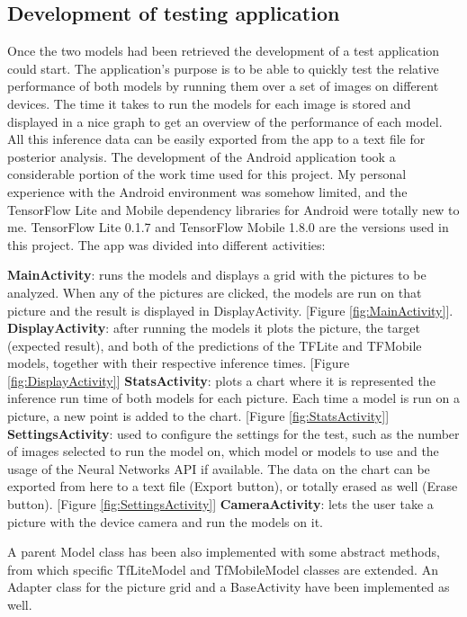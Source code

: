 \subsection{Development of testing application}
Once the two models had been retrieved the development of a test application could start. The application's purpose is to be able to quickly test the relative performance of both models by running them over a set of images on different devices. The time it takes to run the models for each image is stored and displayed in a nice graph to get an overview of the performance of each model. All this inference data can be easily exported from the app to a text file for posterior analysis. The development of the Android application took a considerable portion of the work time used for this project. My personal experience with the Android environment was somehow limited, and the TensorFlow Lite and Mobile dependency libraries for Android were totally new to me. TensorFlow Lite 0.1.7 and TensorFlow Mobile 1.8.0 are the versions used in this project.
The app was divided into different activities: \\
\begin{outline}
\1\textbf{MainActivity}: runs the models and displays a grid with the pictures to be analyzed. When any of the pictures are clicked, the models are run on that picture and the result is displayed in DisplayActivity. [Figure \ref{fig:MainActivity}]. 
\1\textbf{DisplayActivity}: after running the models it plots the picture, the target (expected result), and both of the predictions of the TFLite and TFMobile models, together with their respective inference times. [Figure \ref{fig:DisplayActivity}]
\1\textbf{StatsActivity}: plots a chart where it is represented the inference run time of both models for each picture. Each time a model is run on a picture, a new point is added to the chart. [Figure \ref{fig:StatsActivity}]
\1\textbf{SettingsActivity}: used to configure the settings for the test, such as the number of images selected to run the model on, which model or models to use and the usage of the Neural Networks API if available. The data on the chart can be exported from here to a text file (Export button), or totally erased as well (Erase button). [Figure \ref{fig:SettingsActivity}]
\1\textbf{CameraActivity}: lets the user take a picture with the device camera and run the models on it.
\end{outline}
A parent Model class has been also implemented with some abstract methods, from which specific TfLiteModel and TfMobileModel classes are extended. An Adapter class for the picture grid and a BaseActivity have been implemented as well.
